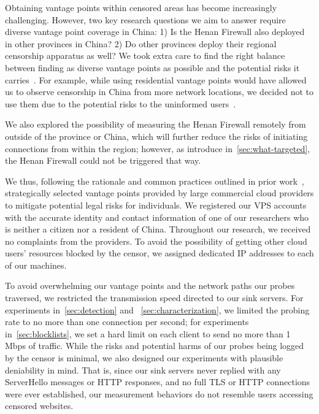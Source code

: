 \documentclass[conference,compsoc]{IEEEtran}
\begin{document}
%
Obtaining vantage points within censored areas has become increasingly challenging.
However,
two key research questions we aim to answer require
diverse vantage point coverage in China:
1) Is the Henan Firewall also deployed in other provinces in China?
2) Do other provinces deploy their regional censorship apparatus as well?
We took extra care to find the right balance
between finding as diverse vantage points as possible
and the potential risks it carries~\cite[\S C.3.2]{menlo-report}.
For example,
while using residential vantage points would have allowed us to observe censorship
in China from more network locations,
we decided not to use them due to the potential risks to the uninformed users~\cite{Mi2019-resident-evil}.

We also explored the possibility of measuring the Henan Firewall remotely from outside of the province or China,
which will further reduce the risks of initiating connections from within the region;
however, as introduce in~\autoref{sec:what-targeted},
the Henan Firewall could not be triggered that way.

We thus,
following the rationale and common practices outlined in prior work~\cite{Wu2023a,Alice2020a},
strategically selected vantage points provided by large commercial cloud providers
to mitigate potential legal risks for individuals.
We registered our VPS accounts with the accurate identity
and contact information of one of our researchers who is
neither a citizen nor a resident of China.
Throughout our research,
we received no complaints from the providers.
To avoid the possibility of getting other cloud users' resources blocked by the censor,
we assigned dedicated IP addresses to each of our machines.

%
To avoid overwhelming our vantage points and the network paths our probes traversed,
we restricted the transmission speed directed to our sink servers.
For experiments in~\autoref{sec:detection} and ~\autoref{sec:characterization},
we limited the probing rate
to no more than one connection per second;
for experiments in~\autoref{sec:blocklists},
we set a hard limit on each client to send no more than 1 Mbps of traffic.
%
While the risks and potential harms of our probes being logged by the censor is minimal,
we also designed our experiments with plausible deniability in mind.
That is,
since our sink servers never replied with any ServerHello messages or HTTP responses,
and no full TLS or HTTP connections were ever established,
our measurement behaviors do not resemble users accessing censored websites.
\end{document}
